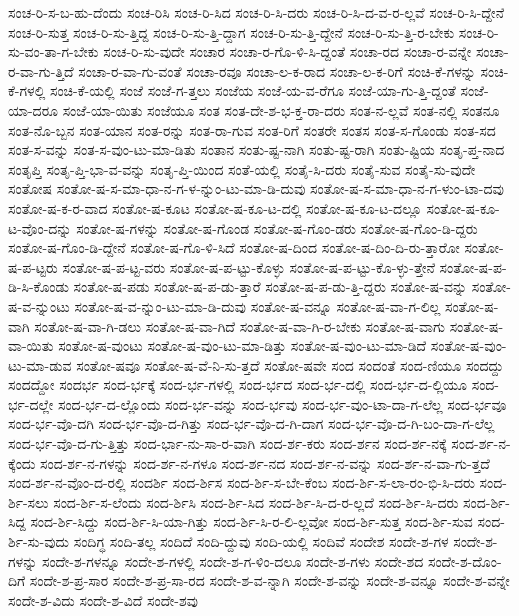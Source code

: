 {ಸಂಚ-ರಿ-ಸ-ಬ-ಹು-ದೆಂದು
ಸಂಚ-ರಿಸಿ
ಸಂಚ-ರಿ-ಸಿದ
ಸಂಚ-ರಿ-ಸಿ-ದರು
ಸಂಚ-ರಿ-ಸಿ-ದ-ವ-ರ-ಲ್ಲವೆ
ಸಂಚ-ರಿ-ಸಿ-ದ್ದೇನೆ
ಸಂಚ-ರಿ-ಸುತ್ತ
ಸಂಚ-ರಿ-ಸು-ತ್ತಿದ್ದ
ಸಂಚ-ರಿ-ಸು-ತ್ತಿ-ದ್ದಾಗ
ಸಂಚ-ರಿ-ಸು-ತ್ತಿ-ದ್ದೇನೆ
ಸಂಚ-ರಿ-ಸು-ತ್ತಿ-ರ-ಬೇಕು
ಸಂಚ-ರಿ-ಸು-ವಂ-ತಾ-ಗ-ಬೇಕು
ಸಂಚ-ರಿ-ಸು-ವುದೇ
ಸಂಚಾರ
ಸಂಚಾ-ರ-ಗೊ-ಳಿ-ಸಿ-ದ್ದಂತೆ
ಸಂಚಾ-ರದ
ಸಂಚಾ-ರ-ವನ್ನೇ
ಸಂಚಾ-ರ-ವಾ-ಗು-ತ್ತಿದೆ
ಸಂಚಾ-ರ-ವಾ-ಗು-ವಂತೆ
ಸಂಚಾ-ರವೂ
ಸಂಚಾ-ಲ-ಕ-ರಾದ
ಸಂಚಾ-ಲ-ಕ-ರಿಗೆ
ಸಂಚಿ-ಕೆ-ಗಳನ್ನು
ಸಂಚಿ-ಕೆ-ಗಳಲ್ಲಿ
ಸಂಚಿ-ಕೆ-ಯಲ್ಲಿ
ಸಂಜೆ
ಸಂಜೆ-ಗ-ತ್ತಲು
ಸಂಜೆಯ
ಸಂಜೆ-ಯ-ವ-ರೆಗೂ
ಸಂಜೆ-ಯಾ-ಗು-ತ್ತಿ-ದ್ದಂತೆ
ಸಂಜೆ-ಯಾ-ದರೂ
ಸಂಜೆ-ಯಾ-ಯಿತು
ಸಂಜೆಯೂ
ಸಂತ
ಸಂತ-ದೇ-ಶ-ಭ-ಕ್ತ-ರಾ-ದರು
ಸಂತ-ನ-ಲ್ಲವೆ
ಸಂತ-ನಲ್ಲಿ
ಸಂತನೂ
ಸಂತ-ನೊ-ಬ್ಬನ
ಸಂತ-ಯಾನ
ಸಂತ-ರನ್ನು
ಸಂತ-ರಾ-ಗುವ
ಸಂತ-ರಿಗೆ
ಸಂತರೇ
ಸಂತಸ
ಸಂತ-ಸ-ಗೊಂಡು
ಸಂತ-ಸದ
ಸಂತ-ಸ-ವನ್ನು
ಸಂತ-ಸ-ವುಂ-ಟು-ಮಾ-ಡಿತು
ಸಂತಾನ
ಸಂತು-ಷ್ಟ-ನಾಗಿ
ಸಂತು-ಷ್ಟ-ರಾಗಿ
ಸಂತು-ಷ್ಟಿಯ
ಸಂತೃ-ಪ್ತ-ನಾದ
ಸಂತೃಪ್ತಿ
ಸಂತೃ-ಪ್ತಿ-ಭಾ-ವ-ವನ್ನು
ಸಂತೃ-ಪ್ತಿ-ಯಿಂದ
ಸಂತೆ-ಯಲ್ಲಿ
ಸಂತೈ-ಸಿ-ದರು
ಸಂತೈ-ಸುವ
ಸಂತೈ-ಸು-ವುದೇ
ಸಂತೋಷ
ಸಂತೋ-ಷ-ಸ-ಮಾ-ಧಾ-ನ-ಗ-ಳ-ನ್ನುಂ-ಟು-ಮಾ-ಡಿ-ದುವು
ಸಂತೋ-ಷ-ಸ-ಮಾ-ಧಾ-ನ-ಗ-ಳುಂ-ಟಾ-ದವು
ಸಂತೋ-ಷ-ಕ-ರ-ವಾದ
ಸಂತೋ-ಷ-ಕೂಟ
ಸಂತೋ-ಷ-ಕೂ-ಟ-ದಲ್ಲಿ
ಸಂತೋ-ಷ-ಕೂ-ಟ-ದಲ್ಲೂ
ಸಂತೋ-ಷ-ಕೂ-ಟ-ವೊಂ-ದನ್ನು
ಸಂತೋ-ಷ-ಗಳನ್ನು
ಸಂತೋ-ಷ-ಗೊಂಡ
ಸಂತೋ-ಷ-ಗೊಂ-ಡರು
ಸಂತೋ-ಷ-ಗೊಂ-ಡಿ-ದ್ದರು
ಸಂತೋ-ಷ-ಗೊಂ-ಡಿ-ದ್ದೇನೆ
ಸಂತೋ-ಷ-ಗೊ-ಳಿ-ಸಿದೆ
ಸಂತೋ-ಷ-ದಿಂದ
ಸಂತೋ-ಷ-ದಿಂ-ದಿ-ರು-ತ್ತಾರೋ
ಸಂತೋ-ಷ-ಪ-ಟ್ಟರು
ಸಂತೋ-ಷ-ಪ-ಟ್ಟ-ವರು
ಸಂತೋ-ಷ-ಪ-ಟ್ಟು-ಕೊಳ್ಳು
ಸಂತೋ-ಷ-ಪ-ಟ್ಟು-ಕೊ-ಳ್ಳು-ತ್ತೇನೆ
ಸಂತೋ-ಷ-ಪ-ಡಿ-ಸಿ-ಕೊಂಡು
ಸಂತೋ-ಷ-ಪಡು
ಸಂತೋ-ಷ-ಪ-ಡು-ತ್ತಾರೆ
ಸಂತೋ-ಷ-ಪ-ಡು-ತ್ತಿ-ದ್ದರು
ಸಂತೋ-ಷ-ವನ್ನು
ಸಂತೋ-ಷ-ವ-ನ್ನುಂಟು
ಸಂತೋ-ಷ-ವ-ನ್ನುಂ-ಟು-ಮಾ-ಡಿ-ದುವು
ಸಂತೋ-ಷ-ವನ್ನೂ
ಸಂತೋ-ಷ-ವಾ-ಗ-ಲಿಲ್ಲ
ಸಂತೋ-ಷ-ವಾಗಿ
ಸಂತೋ-ಷ-ವಾ-ಗಿ-ಡಲು
ಸಂತೋ-ಷ-ವಾ-ಗಿದೆ
ಸಂತೋ-ಷ-ವಾ-ಗಿ-ರ-ಬೇಕು
ಸಂತೋ-ಷ-ವಾಗು
ಸಂತೋ-ಷ-ವಾ-ಯಿತು
ಸಂತೋ-ಷ-ವುಂಟು
ಸಂತೋ-ಷ-ವುಂ-ಟು-ಮಾ-ಡಿತ್ತು
ಸಂತೋ-ಷ-ವುಂ-ಟು-ಮಾ-ಡಿದೆ
ಸಂತೋ-ಷ-ವುಂ-ಟು-ಮಾ-ಡುವ
ಸಂತೋ-ಷವೂ
ಸಂತೋ-ಷ-ವೆ-ನಿ-ಸು-ತ್ತದೆ
ಸಂತೋ-ಷವೇ
ಸಂದ
ಸಂದಂತೆ
ಸಂದ-ಣಿಯೂ
ಸಂದದ್ದು
ಸಂದದ್ದೋ
ಸಂದರ್ಭ
ಸಂದ-ರ್ಭಕ್ಕೆ
ಸಂದ-ರ್ಭ-ಗಳಲ್ಲಿ
ಸಂದ-ರ್ಭದ
ಸಂದ-ರ್ಭ-ದಲ್ಲಿ
ಸಂದ-ರ್ಭ-ದ-ಲ್ಲಿಯೂ
ಸಂದ-ರ್ಭ-ದಲ್ಲೇ
ಸಂದ-ರ್ಭ-ದ-ಲ್ಲೊಂದು
ಸಂದ-ರ್ಭ-ವನ್ನು
ಸಂದ-ರ್ಭವು
ಸಂದ-ರ್ಭ-ವುಂ-ಟಾ-ದಾ-ಗ-ಲೆಲ್ಲ
ಸಂದ-ರ್ಭವೂ
ಸಂದ-ರ್ಭ-ವೊ-ದಗಿ
ಸಂದ-ರ್ಭ-ವೊ-ದ-ಗಿತ್ತು
ಸಂದ-ರ್ಭ-ವೊ-ದ-ಗಿ-ದಾಗ
ಸಂದ-ರ್ಭ-ವೊ-ದ-ಗಿ-ಬಂ-ದಾ-ಗ-ಲೆಲ್ಲ
ಸಂದ-ರ್ಭ-ವೊ-ದ-ಗು-ತ್ತಿತ್ತು
ಸಂದ-ರ್ಭಾ-ನು-ಸಾ-ರ-ವಾಗಿ
ಸಂದ-ರ್ಶ-ಕರು
ಸಂದ-ರ್ಶನ
ಸಂದ-ರ್ಶ-ನಕ್ಕೆ
ಸಂದ-ರ್ಶ-ನ-ಕ್ಕೆಂದು
ಸಂದ-ರ್ಶ-ನ-ಗಳನ್ನು
ಸಂದ-ರ್ಶ-ನ-ಗಳೂ
ಸಂದ-ರ್ಶ-ನದ
ಸಂದ-ರ್ಶ-ನ-ವನ್ನು
ಸಂದ-ರ್ಶ-ನ-ವಾ-ಗು-ತ್ತದೆ
ಸಂದ-ರ್ಶ-ನ-ವೊಂ-ದ-ರಲ್ಲಿ
ಸಂದರ್ಶಿ
ಸಂದ-ರ್ಶಿಸ
ಸಂದ-ರ್ಶಿ-ಸ-ಬೇ-ಕೆಂಬ
ಸಂದ-ರ್ಶಿ-ಸ-ಲಾ-ರಂ-ಭಿ-ಸಿ-ದರು
ಸಂದ-ರ್ಶಿ-ಸಲು
ಸಂದ-ರ್ಶಿ-ಸ-ಲೆಂದು
ಸಂದ-ರ್ಶಿಸಿ
ಸಂದ-ರ್ಶಿ-ಸಿದ
ಸಂದ-ರ್ಶಿ-ಸಿ-ದ-ರ-ಲ್ಲದೆ
ಸಂದ-ರ್ಶಿ-ಸಿ-ದರು
ಸಂದ-ರ್ಶಿ-ಸಿದ್ದ
ಸಂದ-ರ್ಶಿ-ಸಿದ್ದು
ಸಂದ-ರ್ಶಿ-ಸಿ-ಯಾ-ಗಿತ್ತು
ಸಂದ-ರ್ಶಿ-ಸಿ-ರ-ಲಿ-ಲ್ಲವೋ
ಸಂದ-ರ್ಶಿ-ಸುತ್ತ
ಸಂದ-ರ್ಶಿ-ಸುವ
ಸಂದ-ರ್ಶಿ-ಸು-ವುದು
ಸಂದಿಗ್ಧ
ಸಂದಿ-ತಲ್ಲ
ಸಂದಿದೆ
ಸಂದಿ-ದ್ದುವು
ಸಂದಿ-ಯಲ್ಲಿ
ಸಂದಿವೆ
ಸಂದೇಶ
ಸಂದೇ-ಶ-ಗಳ
ಸಂದೇ-ಶ-ಗಳನ್ನು
ಸಂದೇ-ಶ-ಗಳನ್ನೂ
ಸಂದೇ-ಶ-ಗಳಲ್ಲಿ
ಸಂದೇ-ಶ-ಗ-ಳಿಂ-ದಲೂ
ಸಂದೇ-ಶ-ಗಳು
ಸಂದೇ-ಶದ
ಸಂದೇ-ಶ-ದೊಂ-ದಿಗೆ
ಸಂದೇ-ಶ-ಪ್ರ-ಸಾರ
ಸಂದೇ-ಶ-ಪ್ರ-ಸಾ-ರದ
ಸಂದೇ-ಶ-ವ-ನ್ನಾಗಿ
ಸಂದೇ-ಶ-ವನ್ನು
ಸಂದೇ-ಶ-ವನ್ನೂ
ಸಂದೇ-ಶ-ವನ್ನೇ
ಸಂದೇ-ಶ-ವಿದು
ಸಂದೇ-ಶ-ವಿದೆ
ಸಂದೇ-ಶವು
}
